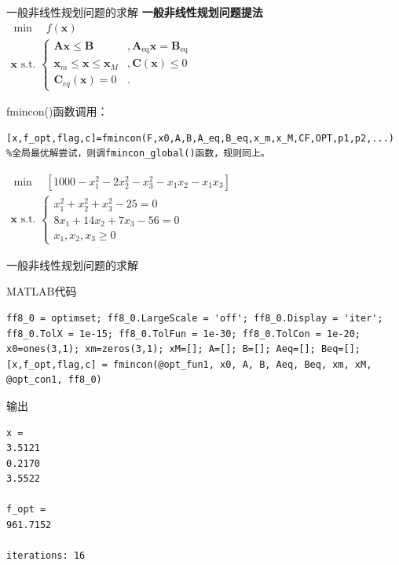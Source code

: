 \documentclass[10pt]{beamer}
\begin{document}
\begin{frame}[fragile]{一般非线性规划问题的求解}
\textbf{一般非线性规划问题提法}$
\begin{array}{l}
	\min \quad f(\mathbf{x})\\
	\mathbf{x} \text { s.t. }\left\{\begin{array}{ll}
		\mathbf{A} \mathbf{x} \leqslant \mathbf{B} &, \mathbf{A}_{\mathrm{eq}} \mathbf{x}=\mathbf{B}_{\mathrm{eq}} \\
		\mathbf{x}_{m} \leqslant \mathbf{x} \leqslant \mathbf{x}_{M} &,\mathbf{C}(\mathbf{x}) \leqslant 0 \\
		\mathbf{C}_{eq}(\mathbf{x})= 0 &.
	\end{array}\right.
\end{array}$
	\begin{block}{fmincon()函数调用：}
\begin{lstlisting}
[x,f_opt,flag,c]=fmincon(F,x0,A,B,A_eq,B_eq,x_m,x_M,CF,OPT,p1,p2,...)
%全局最优解尝试，则调fmincon_global()函数，规则同上。
\end{lstlisting}
	\end{block}

\begin{example}[6-19]
$\begin{array}{l}
\min \quad \left[1000-x_{1}^{2}-2 x_{2}^{2}-x_{3}^{2}-x_{1} x_{2}-x_{1} x_{3}\right]\\
\mathbf{x} \text { s.t. }\left\{\begin{array}{l}
x_{1}^{2}+x_{2}^{2}+x_{3}^{2}-25=0 \\
8 x_{1}+14 x_{2}+7 x_{3}-56=0 \\
x_{1}, x_{2}, x_{3} \geqslant 0
\end{array}\right.
\end{array}
$
\end{example}
\end{frame}
\begin{frame}[fragile]{一般非线性规划问题的求解}
	\begin{block}{MATLAB代码}
\begin{lstlisting}
ff8_0 = optimset; ff8_0.LargeScale = 'off'; ff8_0.Display = 'iter';
ff8_0.TolX = 1e-15; ff8_0.TolFun = 1e-30; ff8_0.TolCon = 1e-20; 
x0=ones(3,1); xm=zeros(3,1); xM=[]; A=[]; B=[]; Aeq=[]; Beq=[];
[x,f_opt,flag,c] = fmincon(@opt_fun1, x0, A, B, Aeq, Beq, xm, xM, @opt_con1, ff8_0)
\end{lstlisting}		
	\end{block}	
	
	\begin{block}{输出}
\begin{lstlisting}
x =
3.5121
0.2170
3.5522

f_opt =
961.7152

iterations: 16
\end{lstlisting}		
	\end{block}	

\end{frame}
\end{document}
